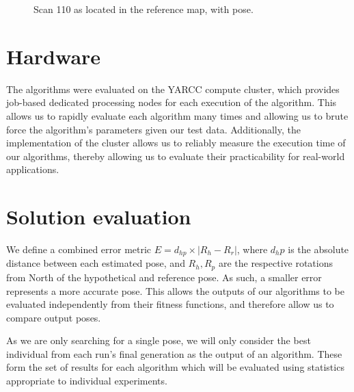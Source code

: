 \documentclass[authoryearcitations]{UoYCSproject}
\begin{document}
\begin{figure}
\begin{subfigure}[b]{0.5\textwidth}
\end{subfigure}
\caption{Scan 110 as located in the reference map, with pose.}
\label{fig:scan110}
\end{figure}

\section{Hardware}
The algorithms were evaluated on the YARCC compute cluster, which provides job-based dedicated processing nodes for each execution of the algorithm. This allows us to rapidly evaluate each algorithm many times and allowing us to brute force the algorithm's parameters given our test data. Additionally, the implementation of the cluster allows us to reliably measure the execution time of our algorithms, thereby allowing us to evaluate their practicability for real-world applications.

\section{Solution evaluation}
We define a combined error metric $E=d_{hp}\times |R_h-R_r|$, where $d_hp$ is the absolute distance between each estimated pose, and $R_h, R_p$ are the respective rotations from North of the hypothetical and reference pose. As such, a smaller error represents a more accurate pose. This allows the outputs of our algorithms to be evaluated independently from their fitness functions, and therefore allow us to compare output poses.

As we are only searching for a single pose, we will only consider the best individual from each run's final generation as the output of an algorithm. These form the set of results for each algorithm which will be evaluated using statistics appropriate to individual experiments. 
\end{document}
